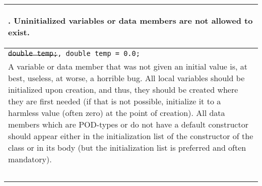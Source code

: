 \documentclass[10pt]{article}
\newenvironment{Mikael}{\color[rgb]{0.7,0.2,0.2}$\diamond$ Mikael: }{\color[rgb]{0,0,0}}
\newcommand{\MP}[1]{\begin{Mikael}#1\end{Mikael}}
\newcommand{\code}[1]{\color[rgb]{0.2,0.8,0.2}\texttt{#1}\color[rgb]{0,0,0} }
\newcounter {iCommandment}
\newcommand{\CorG}[5]
{
\begin{table}[H]
\begin{center}
\begin{tabular}{| p{12cm} |}
\hline
#1. #2 \\
\hline
\vspace{-0.1cm}
\parbox{12cm}{\code{#3}} \\
\vspace{-0.2cm}
#4 \\
#5 \\
\hline
\end{tabular}
\end{center}
\end{table}
}
\newcommand{\Commandment}[4]
{
\CorG{\textbf{\arabic{iCommandment}}\addtocounter{iCommandment}{1}}
{\textbf{#1}}{#2}{#3}{#4}
}
\begin{document}

\Commandment
{Uninitialized variables or data members are not allowed to exist.}
{\sout{double temp;}, double temp = 0.0; }
{A variable or data member that was not given an initial value is, at best, useless, at worse, a horrible 
bug. All local variables should be initialized upon creation, and thus, they should be created where they are 
first needed (if that is not possible, initialize it to a harmless value (often zero) at the point of creation).
All data members which are POD-types or do not have a default constructor should appear either in the initialization 
list of the constructor of the class or in its body (but the initialization list is preferred and often mandatory).}
{\ }
\end{document}

